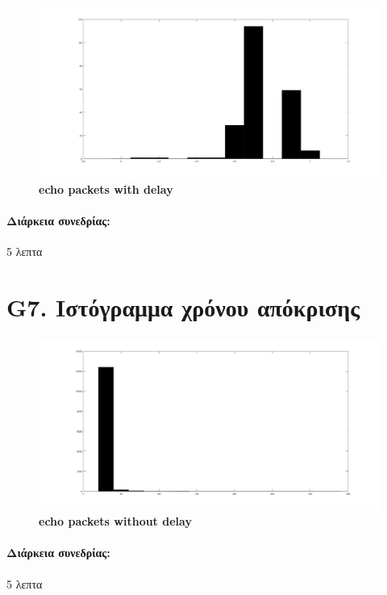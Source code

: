 \documentclass{article}
\begin{document}
\begin{figure}[h!]
 \begin{center}
 \advance\leftskip-6.8cm
  \includegraphics[width=250mm,scale=0.7]{g6s1.jpg}
    \caption*{\textbf{echo packets with delay}}
  
\end{center}
\end{figure}
\paragraph{Διάρκεια συνεδρίας:} 5 λεπτα
\newpage
\large{}

\section*{G7. Ιστόγραμμα χρόνου απόκρισης}

\begin{figure}[h!]
 \begin{center}
 \advance\leftskip-6.8cm
  \includegraphics[width=250mm,scale=0.7]{g7s1.jpg}
    \caption*{\textbf{echo packets without delay}}
  
\end{center}
\end{figure}
\paragraph{Διάρκεια συνεδρίας:} 5 λεπτα
\newpage
\large{}
\end{document}
